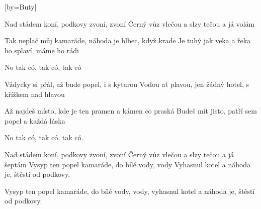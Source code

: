 [by={Buty}]

\beginverse{}
Nad stádem koní, podkovy zvoní, zvoní
Černý vůz vlečou a slzy tečou a já volám
\endverse{}

\beginverse{}
Tak neplač můj kamaráde, náhoda je blbec, když krade
Je tuhý jak veka a řeka ho splaví, máme ho rádi
\endverse{}

\beginchorus{}
No tak có, tak có, tak có
\endchorus{}

\beginverse{}
Vždycky si přál, až bude popel, i s kytarou
Vodou ať plavou, jen žádný hotel, s křížkem nad hlavou
\endverse{}

\beginverse{}
Až najdeš místo, kde je ten pramen a kámen co praská
Budeš mít jisto, patří sem popel a každá láska
\endverse{}

\beginchorus{}
No tak có, tak có, tak có.
\endchorus{}

\beginverse{}
Nad stádem koní, podkovy zvoní, zvoní
Černý vůz vlečou a slzy tečou a já šeptám
Vysyp ten popel kamaráde, do bílé vody, vody
 Vyhasnul kotel a náhoda je, štěstí od podkovy.
\endverse{}

\beginverse{}
\lrep{} Vysyp ten popel kamaráde, do bílé vody, vody,
vyhasnul kotel a náhoda je, štěstí od podkovy. \rrep{}
\endverse{}

\endsong{}
